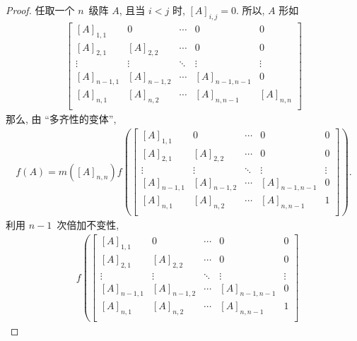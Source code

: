 \begin{proof}
    任取一个 \(n\)~级阵 \(A\),
    且当 \(i < j\) 时, \([A]_{i,j} = 0\).
    所以, \(A\) 形如
    \begin{align*}
        \begin{bmatrix}
            [A]_{1,1}   & 0           & \cdots & 0             & 0         \\
            [A]_{2,1}   & [A]_{2,2}   & \cdots & 0             & 0         \\
            \vdots      & \vdots      & \ddots & \vdots        & \vdots    \\
            [A]_{n-1,1} & [A]_{n-1,2} & \cdots & [A]_{n-1,n-1} & 0         \\
            [A]_{n,1}   & [A]_{n,2}   & \cdots & [A]_{n,n-1}   & [A]_{n,n} \\
        \end{bmatrix}
    \end{align*}
    那么, 由 ``多齐性的变体'',
    \begin{align*}
        f(A) = m([A]_{n,n})
        f\left(
        \begin{bmatrix}
                [A]_{1,1}   & 0           & \cdots & 0             & 0      \\
                [A]_{2,1}   & [A]_{2,2}   & \cdots & 0             & 0      \\
                \vdots      & \vdots      & \ddots & \vdots        & \vdots \\
                [A]_{n-1,1} & [A]_{n-1,2} & \cdots & [A]_{n-1,n-1} & 0      \\
                [A]_{n,1}   & [A]_{n,2}   & \cdots & [A]_{n,n-1}   & 1      \\
            \end{bmatrix}
        \right).
    \end{align*}
    利用 \(n-1\)~次倍加不变性,
    \begin{align*}
             &
        f\left(
        \begin{bmatrix}
                [A]_{1,1}   & 0           & \cdots & 0             & 0      \\
                [A]_{2,1}   & [A]_{2,2}   & \cdots & 0             & 0      \\
                \vdots      & \vdots      & \ddots & \vdots        & \vdots \\
                [A]_{n-1,1} & [A]_{n-1,2} & \cdots & [A]_{n-1,n-1} & 0      \\
                [A]_{n,1}   & [A]_{n,2}   & \cdots & [A]_{n,n-1}   & 1      \\

\end{bmatrix}
\end{align*}
\end{proof}
